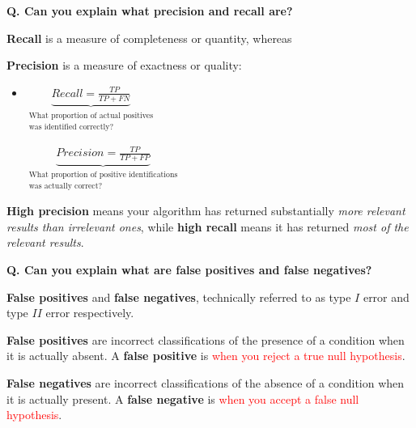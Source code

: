 \begin{frame}[fragile]{\textbf{Q. Can you explain what precision and recall are?}}
\begin{wideitemize}
  \item \textbf{Recall} is a measure of completeness or quantity, whereas
   \item \textbf{Precision} is a measure of exactness or quality:\vspace{.4em}
  \begin{itemize}
    \item \parbox[t]{1.5in}{$\underbrace{Recall = \frac{TP}{TP +
            FN}}_{\substack{\text{What proportion of actual positives}\\ \text{was identified correctly?}}}$} \hspace{.6in}
      \parbox[t]{1.5in}{$\underbrace{Precision = \frac{TP}{TP + FP}}_{\substack{\text{What
            proportion of positive identifications}\\\text{was actually correct?}}}$}
  \end{itemize}
  \item \textbf{High precision} means your algorithm has returned
  substantially \textit{more relevant results than irrelevant ones}, while
  \textbf{high recall} means it has returned \textit{most of the relevant results}.
\end{wideitemize}
\end{frame}


\begin{frame}[fragile]{\textbf{Q. Can you explain what are false positives and false negatives?}}
  \begin{wideitemize}
  \item \textbf{False positives} and \textbf{false negatives}, technically
    referred to as type $I$ error and type $II$ error respectively.
  \item \textbf{False positives} are incorrect classifications of the presence
    of a condition when it is actually absent. {\footnotesize A \textbf{false positive} is \textcolor{red}{when you
      reject a true null hypothesis}}.
  \item \textbf{False negatives} are incorrect classifications of the absence of
    a condition when it is actually present. {\footnotesize A \textbf{false negative} is \textcolor{red}{when you accept
      a false null hypothesis}}.
  \end{wideitemize}
\end{frame}

